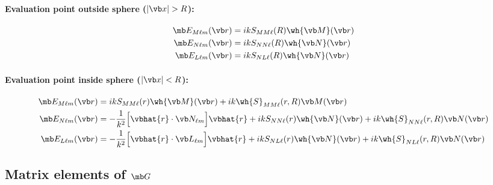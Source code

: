\documentclass[letterpaper]{article}
\begin{document}
\paragraph{Evaluation point outside sphere ($|\vb x|>R$):}

\begin{align*}
 \mb E_{M\ell m}(\vb r)&=ikS_{MM\ell}(R)\wh{\vb M}(\vb r) \\
 \mb E_{N\ell m}(\vb r)&=ikS_{NN\ell}(R)\wh{\vb N}(\vb r) \\
 \mb E_{L\ell m}(\vb r)&=ikS_{NL\ell}(R)\wh{\vb N}(\vb r) \\
\end{align*}

\paragraph{Evaluation point inside sphere ($|\vb x|<R$):}
\begin{subequations}
\begin{align}
 \mb E_{M\ell m}(\vb r)&=
    ik S_{MM\ell}(r)\wh{\vb M}(\vb r)
  + ik \wh{S}_{MM\ell}(r,R)\vb M(\vb r)
\\
 \mb E_{N\ell m}(\vb r)&=
    -\frac{1}{k^2}\Big[\vbhat{r}\cdot \vb N_{\ell m}\Big] \vbhat{r}
  + ik S_{NN\ell}(r)\wh{\vb N}(\vb r)
  + ik \wh{S}_{NN\ell}(r,R)\vb N(\vb r)
\\
 \mb E_{L\ell m}(\vb r)&=
    -\frac{1}{k^2}\Big[\vbhat{r}\cdot \vb L_{\ell m}\Big] \vbhat{r}
  + ik S_{NL\ell}(r)\wh{\vb N}(\vb r)
  + ik \wh{S}_{NL\ell}(r,R)\vb N(\vb r)
\end{align}
\label{InteriorEFields}
\end{subequations}

\subsection{Matrix elements of $\mb G$}
\end{document}
